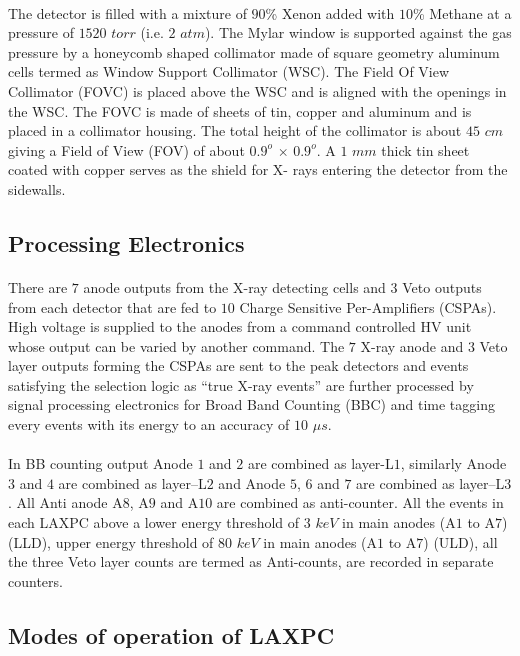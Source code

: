 \documentclass[a4paper,twoside]{report}
\numberwithin{equation}{section}
\begin{document}
\paragraph{}
The detector is filled with a mixture of $90$\% Xenon added with $10$\%  Methane at a pressure of $1520$ $torr$ (i.e. $2$ $atm$). The Mylar window is supported against the gas pressure by a honeycomb shaped collimator made of square geometry aluminum cells termed as Window Support Collimator (WSC). The Field Of View Collimator (FOVC) is placed above the WSC and is aligned with the openings in the WSC. The FOVC is made of sheets of tin, copper and aluminum and is placed in a collimator housing. The total height of the collimator is about $45$ $cm$ giving a Field of View (FOV) of about $0.9^o$ $\times$ $0.9^o$. A $1$ $mm$ thick tin sheet coated with copper serves as the shield for X- rays entering the detector from the sidewalls.
\subsection{Processing Electronics}
\paragraph{}
There are $7$ anode outputs from the X-ray detecting cells and $3$ Veto outputs from each detector that are fed to $10$ Charge Sensitive Per-Amplifiers (CSPAs). High voltage is supplied to the anodes from a command controlled HV unit whose output can be varied by another command. The $7$ X-ray anode and $3$ Veto layer outputs forming the CSPAs are sent to the peak detectors and events satisfying the selection logic as “true X-ray events” are further processed by signal processing electronics for Broad Band Counting (BBC) and time tagging every events with its energy to an accuracy of $10$ $\mu s$.
\paragraph{}
In BB counting output Anode $1$ and $2$ are combined as layer-L$1$, similarly Anode $3$ and $4$ are combined as layer–L$2$ and Anode $5$, $6$ and $7$ are combined as layer–L$3$. All Anti anode A$8$, A$9$ and A$10$ are combined as anti-counter. All the events in each LAXPC above a lower energy threshold of $3$ $keV$ in main anodes (A$1$ to A$7$) (LLD), upper energy threshold of $80$ $keV$ in main anodes (A$1$ to A$7$) (ULD), all the three Veto layer counts are termed as Anti-counts, are recorded in separate counters.
\subsection{Modes of operation of LAXPC}
\end{document}
